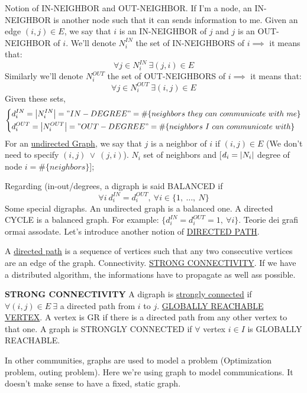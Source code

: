 Notion of IN-NEIGHBOR and OUT-NEIGHBOR. If I'm a node, an IN-NEIGHBOR is another node such that it can sends information to me. Given an edge $(i,j) \in E$, we say that $i$ is an IN-NEIGHBOR of $j$ and $j$ is an OUT-NEIGHBOR of $i$.
We'll denote $N_i^{IN}$ the set of IN-NEIGHBORS of $i \implies$ it means that:
\[
	\forall j \in N_i^{IN}\ \exists (j,i) \in E
\]
Similarly we'll denote $N_i^{OUT}$ the set of OUT-NEIGHBORS of $i \implies$ it means that:
\[
	\forall j \in N_i^{OUT}\ \exists (i,j) \in E
\]	
Given these sets,
\[
	\left\{
	\begin{aligned}
	&d_i^{IN} = \left\vert{N_i^{IN}}\right\vert = "IN-DEGREE" = \#\{neighbors\ they\ can\ communicate\ with\ me\}\\
	&d_i^{OUT} = \left\vert{N_i^{OUT}}\right\vert = "OUT-DEGREE" = \#\{neighbors\ I\ can\ communicate\ with\}
	\end{aligned} 
	\right.
\]
For an \underline{undirected Graph}, we say that $j$ is a neighbor of $i$ if $(i,j) \in E$ (We don't need to specify $(i,j)\ \lor\ (j,i)$). $N_i$ set of neighbors and [$d_i = \left\vert{N_i}\right\vert$ degree of node $i = \#\{neighbors\}$];

Regarding (in-out/degrees, a digraph is said BALANCED if
\[
	\forall i\ d_i^{IN} = d_i^{OUT},\ \forall i \in \{1,\ \dots,\ N\}
\]
Some special digraphs. An undirected graph is a balanced one. A directed CYCLE is a balanced graph. For example: $\{d_i^{IN} = d_i^{OUT} = 1,\ \forall i\}$. Teorie dei grafi ormai assodate. Let's introduce another notion of \underline{DIRECTED PATH}. 

A \underline{directed path} is a sequence of vertices such that any two consecutive vertices are an edge of the graph. Connectivity. \underline{STRONG CONNECTIVITY}. If we have a distributed algorithm, the informations have to propagate as well ass possible.

\begin{defn}{\textbf{STRONG CONNECTIVITY}} \newline
A digraph is \underline{strongly connected} if \newline
$\forall (i,j) \in E\ \exists$ a directed path from $i$ to $j$. \underline{GLOBALLY REACHABLE VERTEX}. A vertex is GR if there is a directed path from any other vertex to that one. A graph is STRONGLY CONNECTED if $\forall$ vertex $i \in I$ is GLOBALLY REACHABLE.
\end{defn}

In other communities, graphs are used to model a problem (Optimization problem, outing problem). Here we're using graph to model communications. It doesn't make sense to have a fixed, static graph.

